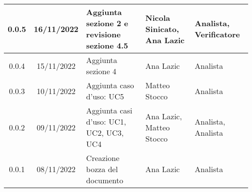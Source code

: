 \begin{center}
\begin{tabularx}{\textwidth}{| c | c | X | X | X |}
	\hline
	0.0.5 & 16/11/2022	 & Aggiunta sezione 2 e revisione sezione 4.5 & Nicola Sinicato, Ana Lazic & Analista, Verificatore\\
	\hline
	0.0.4 & 15/11/2022	 & Aggiunta sezione 4 & Ana Lazic & Analista\\
	\hline
	0.0.3 & 10/11/2022 & Aggiunta caso d’uso: UC5 & Matteo Stocco & Analista\\
	\hline
	0.0.2 & 09/11/2022	 & Aggiunta casi d’uso: UC1, UC2, UC3, UC4 & Ana Lazic, Matteo Stocco & Analista, Analista\\
	\hline
	0.0.1 & 08/11/2022 & Creazione bozza del documento & Ana Lazic & Analista\\
	\hline
\end{tabularx}		
\end{center}

